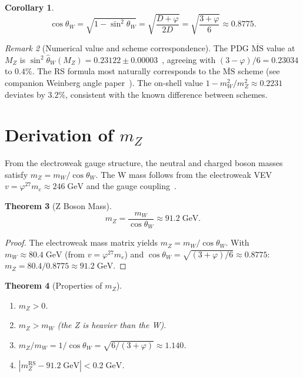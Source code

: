 \documentclass[12pt,a4paper]{article}
\newtheorem{theorem}{Theorem}[section]
\newtheorem{corollary}[theorem]{Corollary}
\theoremstyle{definition}
\theoremstyle{remark}
\newtheorem{remark}[theorem]{Remark}
\begin{document}
\begin{corollary}
\label{cor:cos}
\begin{equation}
  \cos\theta_W = \sqrt{1 - \sin^2\theta_W}
  = \sqrt{\frac{D + \varphi}{2D}}
  = \sqrt{\frac{3 + \varphi}{6}} \approx 0.8775.
\end{equation}
\end{corollary}

\begin{remark}[Numerical value and scheme correspondence]
\label{rem:scheme}
The PDG $\overline{\mathrm{MS}}$ value at $M_Z$ is
$\sin^2\hat\theta_W(M_Z) = 0.23122 \pm 0.00003$~\cite{PDG2024},
agreeing with $(3-\varphi)/6 = 0.23034$ to $0.4\%$.  The RS formula
most naturally corresponds to the $\overline{\mathrm{MS}}$ scheme (see
companion Weinberg angle paper~\cite{RS_Weinberg}).  The on-shell value
$1 - m_W^2/m_Z^2 \approx 0.2231$ deviates by $3.2\%$, consistent with
the known difference between schemes.
\end{remark}

\section{Derivation of $m_Z$}
\label{sec:derivation}

From the electroweak gauge structure, the neutral and charged boson
masses satisfy $m_Z = m_W/\cos\theta_W$.  The W mass follows from
the electroweak VEV $v = \varphi^{27} m_e \approx 246\;\mathrm{GeV}$
and the gauge coupling~\cite{RS_Electroweak_VEV}.

\begin{theorem}[Z Boson Mass]
\label{thm:zmass}
\begin{equation}
  \boxed{m_Z = \frac{m_W}{\cos\theta_W} \approx 91.2\;\mathrm{GeV}.}
\end{equation}
\end{theorem}

\begin{proof}
The electroweak mass matrix yields $m_Z = m_W/\cos\theta_W$.  With
$m_W \approx 80.4\;\mathrm{GeV}$ (from $v = \varphi^{27} m_e$) and
$\cos\theta_W = \sqrt{(3+\varphi)/6} \approx 0.8775$:
$m_Z = 80.4/0.8775 \approx 91.2\;\mathrm{GeV}$.
\end{proof}

\begin{theorem}[Properties of $m_Z$]
\label{thm:properties}
\begin{enumerate}[label=(\roman*),nosep]
  \item $m_Z > 0$.
  \item $m_Z > m_W$ (the Z is heavier than the W).
  \item $m_Z/m_W = 1/\cos\theta_W = \sqrt{6/(3+\varphi)} \approx 1.140$.
  \item $|m_Z^{\mathrm{RS}} - 91.2\;\mathrm{GeV}| < 0.2\;\mathrm{GeV}$.
\end{enumerate}
\end{theorem}
\end{document}

